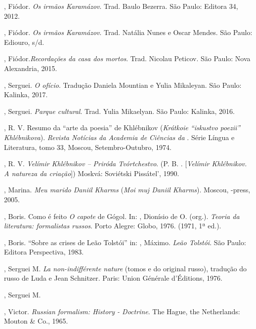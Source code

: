 , Fiódor. \emph{Os irmãos Karamázov}. Trad. Baulo Bezerra.
São Paulo: Editora 34, 2012.

, Fiódor. \emph{Os irmãos Karamázov}. Trad. Natália Nunes e Oscar Mendes. São Paulo: Ediouro, s/d.

, Fiódor.\emph{Recordações da casa dos mortos}. Trad.
Nicolau Peticov. São Paulo: Nova Alexandria, 2015.

, Serguei. \emph{O ofício}. Tradução Daniela Mountian e Yulia Mikaleyan. São Paulo: Kalinka, 2017.

, Serguei. \emph{Parque cultural}. Trad. Yulia Mikaelyan. São Paulo: Kalinka, 2016.

, R. V. Resumo da ``arte da poesia'' de Khlébnikov (\emph{Krátkoie ``iskustvo
poezii'' Khlébnikova}). \emph{Revista Notícias da Academia de Ciências da
}. Série Língua e Literatura, tomo 33, Moscou, Setembro-Outubro,
1974.

, R. V. \emph{Velímir Khlébnikov -- Priróda Tvórtchestvo}. (P. B.
{}.
{[}\emph{Velímir Khlébnikov. A natureza da criação}{]}) Moskvá:
Soviétski Pissátel', 1990.

, Marina. \emph{Meu marido Daniil Kharms} (\emph{Moi muj Daniil Kharms}). Moscou, -press, 2005.

, Boris. Como é feito \emph{O capote} de Gógol. In: , Dionísio de O. (org.). \emph{Teoria da literatura: formalistas russos}. Porto Alegre: Globo, 1976. (1971, 1ª ed.).

, Boris. ``Sobre as crises de Leão Tolstói'' in: ,
Máximo. \emph{Leão Tolstói}. São Paulo: Editora Perspectiva, 1983.

, Serguei M. \emph{La non-indifférente nature } (tomos 
e  do original russo), tradução do russo de Luda e Jean Schnitzer.
Paris: Union Générale d'Éditions, 1976.

, Serguei M. {}

, Victor. \emph{Russian formalism: History - Doctrine}. The Hague,
the Netherlands: Mouton \& Co., 1965.

